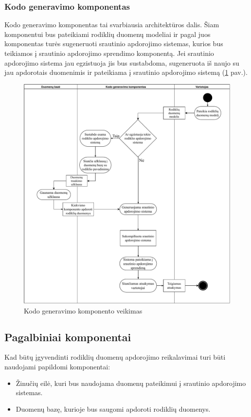 \documentclass{VUMIFPSbakalaurinis}
\begin{document}
\subsubsection{Kodo generavimo komponentas}

Kodo generavimo komponentas tai svarbiausia architektūros dalis. Šiam komponentui bus pateikiami rodiklių duomenų modeliai ir pagal juos komponentas turės sugeneruoti srautinio apdorojimo sistemas, kurios bus teikiamos į srautinio apdorojimo sprendimo komponentą. Jei srautinio apdorojimo sistema jau egzistuoja jis bus sustabdoma, sugeneruota iš naujo su jau apdorotais duomenimis ir pateikiama į srautinio apdorojimo sistemą (\ref{img:generation-flow} pav.).

\begin{figure}[H]
    \centering
    \includegraphics[width=1\textwidth]{img/generation-flow.pdf}
    \caption{Kodo generavimo komponento veikimas}
    \label{img:generation-flow}
\end{figure}

\subsection{Pagalbiniai komponentai}
Kad būtų įgyvendinti rodiklių duomenų apdorojimo reikalavimai turi būti naudojami papildomi komponentai:
\begin{itemize}
    \item Žinučių eilė, kuri bus naudojama duomenų pateikimui į srautinio apdorojimo sistemas.
    \item Duomenų bazę, kurioje bus saugomi apdoroti rodiklių duomenys.
\end{itemize}
\end{document}
